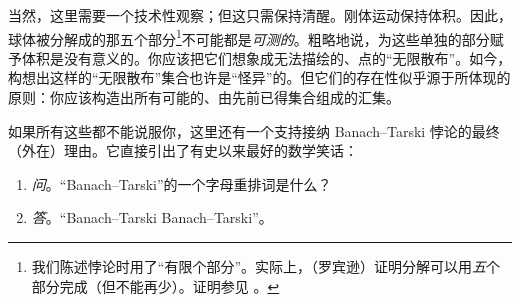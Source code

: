 \documentclass[../../../include/open-logic-section]{subfiles}
\begin{document}
当然，这里需要一个技术性观察；但这只需保持清醒。刚体运动保持体积。因此，球体被分解成的那五个部分\footnote{我们陈述悖论时用了“有限个部分”。实际上，\citet{Robinson1947}（罗宾逊）证明分解可以用\emph{五}个部分完成（但不能再少）。证明参见 \citet[pp.~66--7]{Wagon2016}。}不可能都是\emph{可测的}。粗略地说，为这些单独的部分赋予体积是没有意义的。你应该把它们想象成无法描绘的、点的“无限散布”。如今，构想出这样的“无限散布”集合也许是“怪异”的。但它们的存在性似乎源于\stagesacc{}所体现的原则：你应该构造出所有可能的、由先前已得集合组成的汇集。

如果所有这些都不能说服你，这里还有一个支持接纳 Banach--Tarski 悖论的最终（外在）理由。它直接引出了有史以来最好的数学笑话：

\begin{enumerate}
	\item[] \emph{问}。“Banach--Tarski”的一个字母重排词是什么？
	\item[] \emph{答}。“Banach--Tarski Banach--Tarski”。
\end{enumerate}
\end{document}
